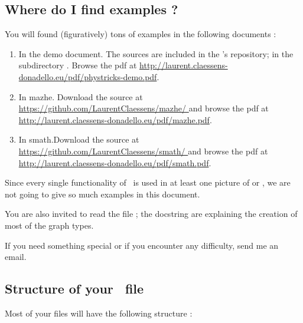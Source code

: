 \subsection{Where do I find examples ?}

You will found (figuratively) tons of examples in the following documents :
\begin{enumerate}
    \item
        In the demo document. The sources are included in the \phystricks's repository; in the subdirectory . Browse the pdf at \url{http://laurent.claessens-donadello.eu/pdf/phystricks-demo.pdf}.
    \item
        In mazhe. Download the source at \url{ https://github.com/LaurentClaessens/mazhe/ } and browse the pdf at \url{http://laurent.claessens-donadello.eu/pdf/mazhe.pdf}.
    \item
        In smath.Download the source at \url{ https://github.com/LaurentClaessens/smath/ } and browse the pdf at \url{http://laurent.claessens-donadello.eu/pdf/smath.pdf}.
\end{enumerate}
Since every single functionality of \phystricks\ is used in at least one picture of  or , we are not going to give so much examples in this document.

You are also invited to read the file ; the docstring are explaining the creation of most of the graph types.

If you need something special or if you encounter any difficulty, send me an email.

\subsection{Structure of your \phystricks\ file}

Most of your \phystricks files will have the following structure :



